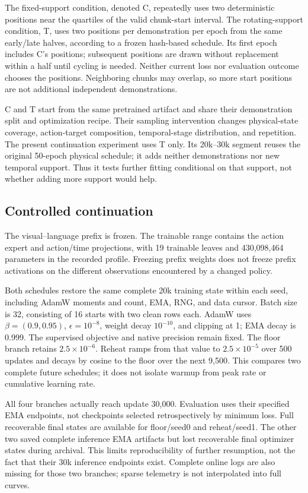 \documentclass[conference]{IEEEtran}
\begin{document}
The fixed-support condition, denoted C, repeatedly uses two deterministic positions near the quartiles of the valid chunk-start interval. The rotating-support condition, T, uses two positions per demonstration per epoch from the same early/late halves, according to a frozen hash-based schedule. Its first epoch includes C's positions; subsequent positions are drawn without replacement within a half until cycling is needed. Neither current loss nor evaluation outcome chooses the positions. Neighboring chunks may overlap, so more start positions are not additional independent demonstrations.

C and T start from the same pretrained artifact and share their demonstration split and optimization recipe. Their sampling intervention changes physical-state coverage, action-target composition, temporal-stage distribution, and repetition. The present continuation experiment uses T only. Its 20k--30k segment reuses the original 50-epoch physical schedule; it adds neither demonstrations nor new temporal support. Thus it tests further fitting conditional on that support, not whether adding more support would help.

\subsection{Controlled continuation}
The visual--language prefix is frozen. The trainable range contains the action expert and action/time projections, with 19 trainable leaves and 430,098,464 parameters in the recorded profile. Freezing prefix weights does not freeze prefix activations on the different observations encountered by a changed policy.

Both schedules restore the same complete 20k training state within each seed, including AdamW moments and count, EMA, RNG, and data cursor. Batch size is 32, consisting of 16 starts with two clean rows each. AdamW uses $\beta=(0.9,0.95)$, $\epsilon=10^{-8}$, weight decay $10^{-10}$, and clipping at 1; EMA decay is 0.999. The supervised objective and native precision remain fixed. The floor branch retains $2.5\!\times\!10^{-6}$. Reheat ramps from that value to $2.5\!\times\!10^{-5}$ over 500 updates and decays by cosine to the floor over the next 9,500. This compares two complete future schedules; it does not isolate warmup from peak rate or cumulative learning rate.

All four branches actually reach update 30,000. Evaluation uses their specified EMA endpoints, not checkpoints selected retrospectively by minimum loss. Full recoverable final states are available for floor/seed0 and reheat/seed1. The other two saved complete inference EMA artifacts but lost recoverable final optimizer states during archival. This limits reproducibility of further resumption, not the fact that their 30k inference endpoints exist. Complete online logs are also missing for those two branches; sparse telemetry is not interpolated into full curves.
\end{document}

